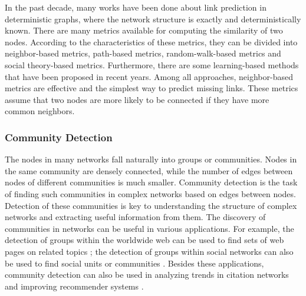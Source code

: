 \documentclass[\main/thesis.tex]{subfiles}
\begin{document}
In the past decade, many works have been done about link prediction in deterministic graphs, where the network structure is exactly and deterministically known. There are many metrics available for computing the similarity of two nodes. According to the characteristics of these metrics, they can be divided into neighbor-based metrics, path-based metrics, random-walk-based metrics and social theory-based metrics. Furthermore, there are some learning-based methods that have been proposed in recent years. Among all approaches, neighbor-based metrics are effective and the simplest way to predict missing links. These metrics assume that two nodes are more likely to be connected if they have more common neighbors. %

\subsubsection{Community Detection}
The nodes in many networks fall naturally into groups or communities. Nodes in the same community are densely connected, while the number of edges between nodes of different communities is much smaller. Community detection is the task of finding such communities in complex networks based on edges between nodes. Detection of these communities is key to understanding the structure of complex networks and extracting useful information from them. The discovery of communities in networks can be useful in various applications. For example, the detection of groups within the worldwide web can be used to find sets of web pages on related topics \cite{flake2002self}; the detection of groups within social networks can also be used to find social units or communities \cite{girvan2002community}. Besides these applications, community detection can also be used in analyzing trends in citation networks \cite{bedi2016community} and improving recommender systems \cite{cao2015improved}. 
\end{document}
